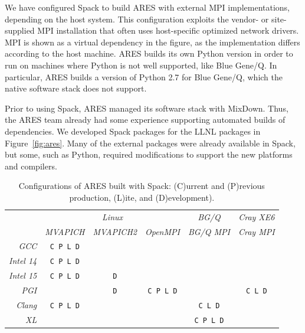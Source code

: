 We have configured Spack to build ARES with external MPI implementations, 
depending on the host system. This configuration exploits the vendor- 
or site-supplied MPI installation that often uses host-specific optimized 
network drivers. MPI is shown as a virtual dependency in the figure, as 
the implementation differs according to the host machine.  ARES builds its 
own Python version in order to run on machines where Python is not well 
supported, like Blue Gene/Q.  In particular, ARES builds a version of 
Python 2.7 for Blue Gene/Q, which the native software stack does not support.

Prior to using Spack, ARES managed its software stack with MixDown.
Thus, the ARES team already had some experience supporting 
automated builds of dependencies. We developed Spack packages for the LLNL 
packages in Figure~\ref{fig:ares}. Many of the external packages were already 
available in Spack, but some, such as Python, required modifications to support
the new platforms and compilers.

\newcommand{\hfmt}[1]{\textit{\scriptsize #1}}
\newcommand{\cfmt}[1]{\texttt{\scriptsize #1}}

\begin{table}\centering %
\footnotesize
\begin{tabular}{|r|c|c|c|c|c|}
\hline
\multirow{2}{*}{} & \multicolumn{3}{|c|}{\hfmt{Linux}}                      & {\hfmt{BG/Q}}     & {\hfmt{Cray XE6}} \\\cline{2-6}
                  & {\hfmt{MVAPICH}} & {\hfmt{MVAPICH2}} & {\hfmt{OpenMPI}} & {\hfmt{BG/Q MPI}} & {\hfmt{Cray MPI}} \\\hline
{\hfmt{GCC}}      & {\cfmt{C P L D}} &                   &                  &                   &                   \\\hline
{\hfmt{Intel 14}} & {\cfmt{C P L D}} &                   &                  &                   &                   \\\hline
{\hfmt{Intel 15}} & {\cfmt{C P L D}} & {\cfmt{D}}        &                  &                   &                   \\\hline
{\hfmt{PGI}}      &                  & {\cfmt{D}}        & {\cfmt{C P L D}} &                   & {\cfmt{C L D}}    \\\hline
{\hfmt{Clang}}    & {\cfmt{C P L D}} &                   &                  & {\cfmt{C L D}}    &                   \\\hline
{\hfmt{XL}}       &                  &                   &                  & {\cfmt{C P L D}}  &                   \\\hline
\end{tabular}
\caption{
	Configurations of ARES built with Spack: \newline
	(C)urrent and
	(P)revious production, (L)ite, and (D)evelopment).
	\label{tab:ares-configs}
}
\end{table}

